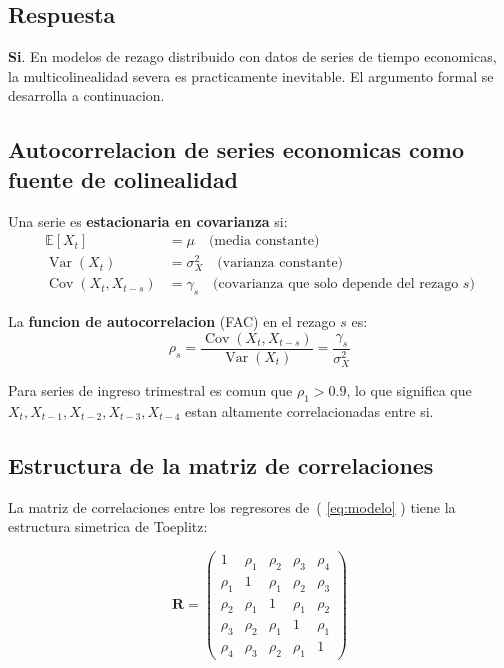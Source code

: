 \documentclass[12pt, letterpaper]{article}
\theoremstyle{remark}
\newcommand{\E}{\mathbb{E}}
\newcommand{\Var}{\operatorname{Var}}
\newcommand{\Cov}{\operatorname{Cov}}
\begin{document}
\subsection{Respuesta}

\textbf{Si}. En modelos de rezago distribuido con datos de series de tiempo
economicas, la multicolinealidad severa es practicamente inevitable. El argumento
formal se desarrolla a continuacion.

\subsection{Autocorrelacion de series economicas como fuente de colinealidad}

Una serie es \textbf{estacionaria en covarianza} si:
\begin{align}
  \E[X_t] &= \mu \quad \text{(media constante)}\\
  \Var(X_t) &= \sigma^2_X \quad \text{(varianza constante)}\\
  \Cov(X_t, X_{t-s}) &= \gamma_s \quad \text{(covarianza que solo depende del rezago } s\text{)}
\end{align}

La \textbf{funcion de autocorrelacion} (FAC) en el rezago $s$ es:
\begin{equation}
  \rho_s = \frac{\Cov(X_t, X_{t-s})}{\Var(X_t)} = \frac{\gamma_s}{\sigma^2_X}
  \label{eq:autocorr}
\end{equation}

Para series de ingreso trimestral es comun que $\rho_1 > 0.9$, lo que significa
que $X_t, X_{t-1}, X_{t-2}, X_{t-3}, X_{t-4}$ estan altamente correlacionadas
entre si.

\subsection{Estructura de la matriz de correlaciones}

La matriz de correlaciones entre los regresores de~( \ref{eq:modelo} ) tiene la
estructura simetrica de Toeplitz:

\begin{equation}
  \mathbf{R} =
  \begin{pmatrix}
    1      & \rho_1  & \rho_2  & \rho_3  & \rho_4  \\
    \rho_1 & 1       & \rho_1  & \rho_2  & \rho_3  \\
    \rho_2 & \rho_1  & 1       & \rho_1  & \rho_2  \\
    \rho_3 & \rho_2  & \rho_1  & 1       & \rho_1  \\
    \rho_4 & \rho_3  & \rho_2  & \rho_1  & 1
  \end{pmatrix}
  \label{eq:matriz_R}
\end{equation}
\end{document}
